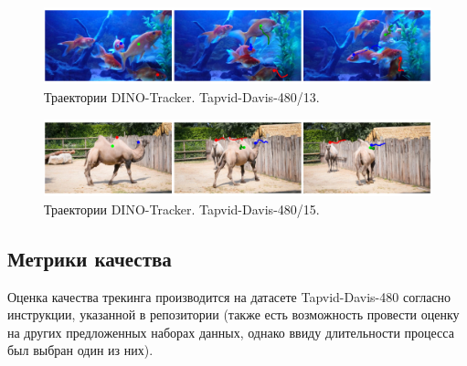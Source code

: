 \documentclass[a4paper, 14pt]{extarticle}
\theoremstyle{definition}
\theoremstyle{plain}
\theoremstyle{remark}
\begin{document}
\begin{figure}
    [H]
    \centering
    \includegraphics[width=\textwidth]{figs/davis-13.png}
    \caption{Траектории DINO-Tracker. Tapvid-Davis-480/13.}
    \label{fig:davis-13}
\end{figure}
\begin{figure}
    [H]
    \centering
    \includegraphics[width=\textwidth]{figs/davis-15.png}
    \caption{Траектории DINO-Tracker. Tapvid-Davis-480/15.}
    \label{fig:davis-15}
\end{figure}

\subsection{Метрики качества}

Оценка качества трекинга производится на датасете Tapvid-Davis-480 согласно инструкции, указанной в репозитории (также есть возможность провести оценку на других предложенных наборах данных, однако ввиду длительности процесса был выбран один из них).
\end{document}
